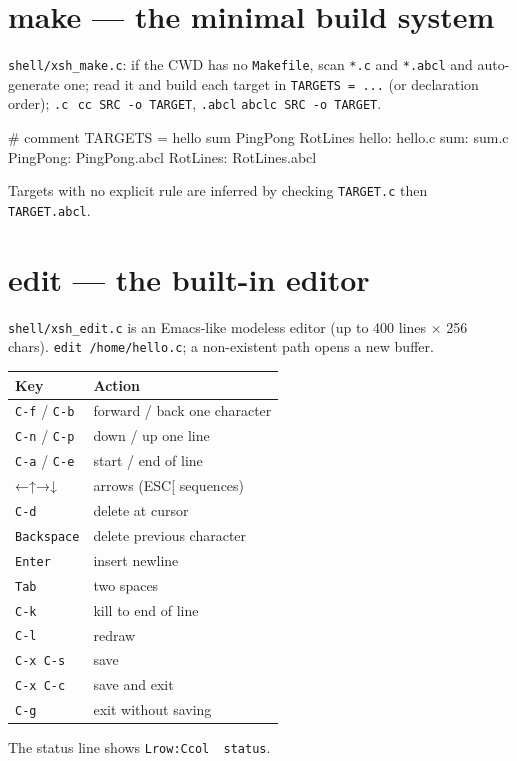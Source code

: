 \documentclass[a4paper,11pt]{article}
\begin{document}
\section{make --- the minimal build system}
\verb|shell/xsh_make.c|: if the CWD has no \verb|Makefile|, scan \verb|*.c| and
\verb|*.abcl| and auto-generate one; read it and build each target in
\verb|TARGETS = ...| (or declaration order); \verb|.c|\,\textrightarrow{}\,
\verb|cc SRC -o TARGET|, \verb|.abcl|\,\textrightarrow{}\,\verb|abclc SRC -o TARGET|.
\begin{code}
# comment
TARGETS = hello sum PingPong RotLines
hello:    hello.c
sum:      sum.c
PingPong: PingPong.abcl
RotLines: RotLines.abcl
\end{code}
Targets with no explicit rule are inferred by checking \verb|TARGET.c| then
\verb|TARGET.abcl|.

\section{edit --- the built-in editor}
\verb|shell/xsh_edit.c| is an Emacs-like modeless editor (up to 400 lines × 256
chars). \verb|edit /home/hello.c|; a non-existent path opens a new buffer.
\begin{center}\footnotesize
\begin{tabular}{@{}l l@{}}
\toprule \textbf{Key} & \textbf{Action}\\ \midrule
\verb|C-f| / \verb|C-b| & forward / back one character\\
\verb|C-n| / \verb|C-p| & down / up one line\\
\verb|C-a| / \verb|C-e| & start / end of line\\
←↑→↓ & arrows (ESC[ sequences)\\
\verb|C-d| & delete at cursor\\
\verb|Backspace| & delete previous character\\
\verb|Enter| & insert newline\\
\verb|Tab| & two spaces\\
\verb|C-k| & kill to end of line\\
\verb|C-l| & redraw\\
\verb|C-x C-s| & save\\
\verb|C-x C-c| & save and exit\\
\verb|C-g| & exit without saving\\
\bottomrule
\end{tabular}
\end{center}
The status line shows \verb|Lrow:Ccol  status|.
\end{document}
